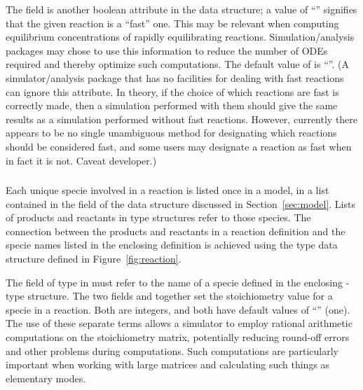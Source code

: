 \documentclass[10pt]{cekarticle}
\newcommand{\vref}[1]{\ref{#1}}
\begin{document}
The field  is another boolean attribute in the
 data structure; a value of ``''
signifies that the given reaction is a ``fast'' one.  This may be relevant
when computing equilibrium concentrations of rapidly equilibrating
reactions.  Simulation/analysis packages may chose to use this information
to reduce the number of ODEs required and thereby optimize such
computations.  The default value of  is
``''.  (A simulator/analysis package that has no
facilities for dealing with fast reactions can ignore this attribute.  In
theory, if the choice of which reactions are fast is correctly made, then a
simulation performed with them should give the same results as a simulation
performed without fast reactions.  However, currently there appears to be
no single unambiguous method for designating which reactions should be
considered fast, and some users may designate a reaction as fast when in
fact it is not.  Caveat developer.)


\subsubsection{}
\label{subsec:speciesreference}

Each unique specie involved in a reaction is listed once in a model, in a
list contained in the  field of the  data
structure discussed in Section~\ref{sec:model}.  Lists of products and
reactants in  type structures refer to those species.  The
connection between the products and reactants in a reaction definition and
the specie names listed in the enclosing  definition is
achieved using the  type data structure defined in
Figure~\vref{fig:reaction}.

The field  of type  in 
must refer to the name of a specie defined in the enclosing
-type structure.  The two fields  and
 together set the stoichiometry value for a specie in a
reaction.  Both are integers, and both have default values of
``'' (one).  The use of these separate terms allows a
simulator to employ rational arithmetic computations on the stoichiometry
matrix, potentially reducing round-off errors and other problems during
computations.  Such computations are particularly important when working
with large matrices and calculating such things as elementary modes.
\end{document}
